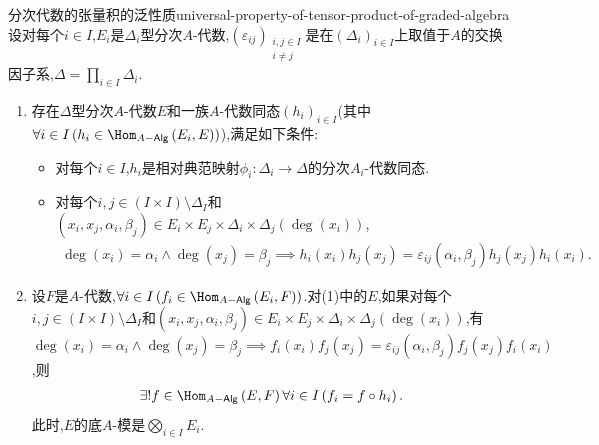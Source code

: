 \begin{proposition}{分次代数的张量积的泛性质}{universal-property-of-tensor-product-of-graded-algebra}
	设对每个$i\in I$,$E_{i}$是$\Delta_{i}$型分次$A$-代数,$\left(\varepsilon_{ij}\right)_{\substack{i,j\in I\\i\neq j}}$是在$\left(\Delta_{i}\right)_{i\in I}$上取值于$A$的交换因子系,$\Delta=\prod\limits_{i\in I}\Delta_{i}$.
	\begin{enumerate}
		\item 存在$\Delta$型分次$A$-代数$E$和一族$A$-代数同态$\left(h_{i}\right)_{i\in I}$(其中$\forall i\in I\left(h_{i}\in\Hom_{A-\mathsf{Alg}}\left(E_{i},E\right)\right)$),满足如下条件:
		\begin{itemize}
			\item 对每个$i\in I$,$h_{i}$是相对典范映射$\phi_{i}:\Delta_{i}\to\Delta$的分次$A_{i}$-代数同态.
			\item 对每个$i,j\in\left(I\times I\right)\setminus\Delta_{I}$和$\left(x_{i},x_{j},\alpha_{i},\beta_{j}\right)\in E_{i}\times E_{j}\times\Delta_{i}\times\Delta_{j}\left(\deg\left(x_{i}\right)\right)$,
			\begin{align*}
				\deg\left(x_{i}\right)=\alpha_{i}\wedge\deg\left(x_{j}\right)=\beta_{j}\implies h_{i}\left(x_{i}\right)h_{j}\left(x_{j}\right)=\varepsilon_{ij}\left(\alpha_{i},\beta_{j}\right)h_{j}\left(x_{j}\right)h_{i}\left(x_{i}\right).
			\end{align*}
		\end{itemize}
		\item 设$F$是$A$-代数,$\forall i\in I\left(f_{i}\in\Hom_{A-\mathsf{Alg}}\left(E_{i},F\right)\right)$.对(1)中的$E$,如果对每个$i,j\in\left(I\times I\right)\setminus\Delta_{I}$和$\left(x_{i},x_{j},\alpha_{i},\beta_{j}\right)\in E_{i}\times E_{j}\times\Delta_{i}\times\Delta_{j}\left(\deg\left(x_{i}\right)\right)$,有$\deg\left(x_{i}\right)=\alpha_{i}\wedge\deg\left(x_{j}\right)=\beta_{j}\implies f_{i}\left(x_{i}\right)f_{j}\left(x_{j}\right)=\varepsilon_{ij}\left(\alpha_{i},\beta_{j}\right)f_{j}\left(x_{j}\right)f_{i}\left(x_{i}\right)$,则
		\begin{align*}
			\exists!f\in\Hom_{A-\mathsf{Alg}}\left(E,F\right)\forall i\in I\left(f_{i}=f\circ h_{i}\right).
		\end{align*}
		此时,$E$的底$A$-模是$\bigotimes\limits_{i\in I}E_{i}$.
	\end{enumerate}
\end{proposition}

